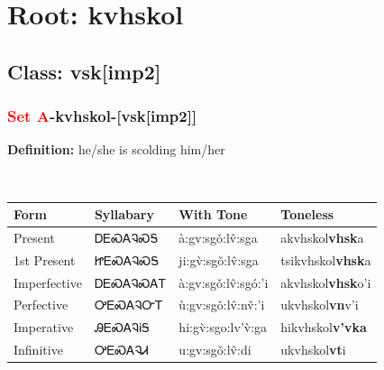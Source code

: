 \needspace{4in}
\section*{Root: kvhskol}
\nopagebreak
{}
\needspace{3in}
\subsection*{Class: vsk[imp2]}
\nopagebreak
\needspace{2in}
\subsubsection*{\textcolor{Red}{Set A}{-}\textbf{kvhskol}{-}[vsk[imp2]]}
\nopagebreak
\textbf{Definition: } he/she is scolding him/her
\\[0.5em]
\begin{tabularx}{\textwidth}{l X X X}%
\toprule%
\textbf{Form}&\textbf{Syllabary}&\textbf{With Tone}&\textbf{Toneless}\\%
\midrule%
Present&ᎠᎬᏍᎪᎸᏍᎦ&à:gv:sgǒ:lv̂:sga&akvhskol\textbf{vhsk}a\\%
1st Present&ᏥᎬᏍᎪᎸᏍᎦ&ji:gv̀:sgǒ:lv̂:sga&tsikvhskol\textbf{vhsk}a\\%
Imperfective&ᎠᎬᏍᎪᎸᏍᎪᎢ&à:gv:sgǒ:lv̂:sgó:’i&akvhskol\textbf{vhsk}o'i\\%
Perfective&ᎤᎬᏍᎪᎸᏅᎢ&ù:gv:sgǒ:lv̂:nv̌:’i&ukvhskol\textbf{vn}v'i\\%
Imperative&ᎯᎬᏍᎪᎸᎥᎦ&hi:gv̀:sgo:lv’v̀:ga&hikvhskol\textbf{v'vka}\\%
Infinitive&ᎤᎬᏍᎪᎸᏗ&u:gv:sgǒ:lv̂:di&ukvhskol\textbf{vt}i\\%
\bottomrule%
\end{tabularx}
\\[1em]